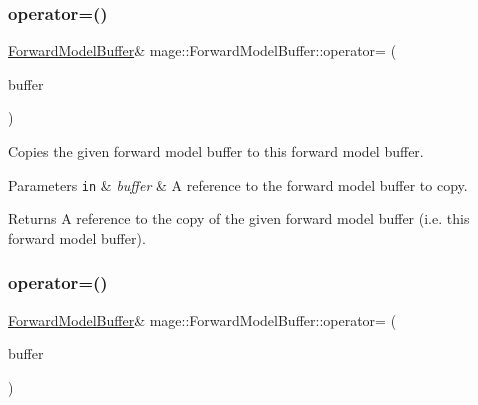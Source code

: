 \subsubsection{\texorpdfstring{operator=()}{operator=()}\hspace{0.1cm}{\footnotesize\ttfamily [1/2]}}
{\footnotesize\ttfamily \hyperlink{structmage_1_1_forward_model_buffer}{Forward\+Model\+Buffer}\& mage\+::\+Forward\+Model\+Buffer\+::operator= (\begin{DoxyParamCaption}\item[{const \hyperlink{structmage_1_1_forward_model_buffer}{Forward\+Model\+Buffer} \&}]{buffer }\end{DoxyParamCaption})\hspace{0.3cm}{\ttfamily [default]}}

Copies the given forward model buffer to this forward model buffer.


\begin{DoxyParams}[1]{Parameters}
\mbox{\tt in}  & {\em buffer} & A reference to the forward model buffer to copy. \\
\hline
\end{DoxyParams}
\begin{DoxyReturn}{Returns}
A reference to the copy of the given forward model buffer (i.\+e. this forward model buffer). 
\end{DoxyReturn}
\hypertarget{structmage_1_1_forward_model_buffer_afa40459d41558ab9daf8172886568461}{}\label{structmage_1_1_forward_model_buffer_afa40459d41558ab9daf8172886568461} 
\subsubsection{\texorpdfstring{operator=()}{operator=()}\hspace{0.1cm}{\footnotesize\ttfamily [2/2]}}
{\footnotesize\ttfamily \hyperlink{structmage_1_1_forward_model_buffer}{Forward\+Model\+Buffer}\& mage\+::\+Forward\+Model\+Buffer\+::operator= (\begin{DoxyParamCaption}\item[{\hyperlink{structmage_1_1_forward_model_buffer}{Forward\+Model\+Buffer} \&\&}]{buffer }\end{DoxyParamCaption})\hspace{0.3cm}{\ttfamily [default]}}

